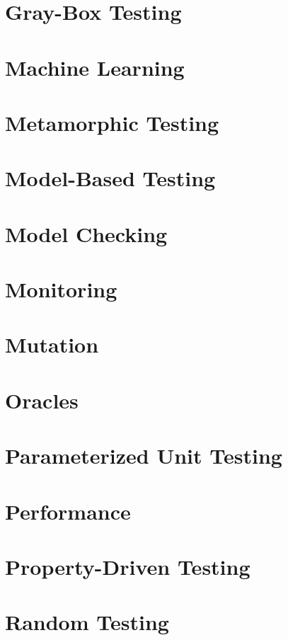 \chapter{Gray-Box Testing}

\chapter{Machine Learning}

\chapter{Metamorphic Testing}

\chapter{Model-Based Testing}

\chapter{Model Checking}

\chapter{Monitoring}

\chapter{Mutation}

\chapter{Oracles}

\chapter{Parameterized Unit Testing}

\chapter{Performance}

\chapter{Property-Driven Testing}

\chapter{Random Testing}

